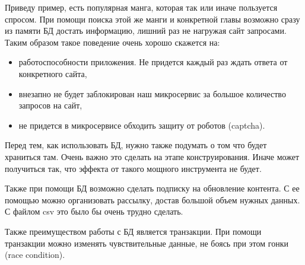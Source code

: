 Приведу пример, есть популярная манга, которая так или иначе пользуется спросом.
При помощи поиска этой же манги и конкретной главы возможно сразу из памяти БД достать информацию, лишний раз не нагружая сайт запросами.
Таким образом такое поведение очень хорошо скажется на:
\begin{itemize}
    \item работоспособности приложения. Не придется каждый раз ждать ответа от конкретного сайта,
    \item внезапно не будет заблокирован наш микросервис за большое количество запросов на сайт,
    \item не придется в микросервисе обходить защиту от роботов (captcha).
\end{itemize} 

Перед тем, как использовать БД, нужно также подумать о том что будет храниться там. Очень важно это сделать на этапе конструирования.
Иначе может получиться так, что эффекта от такого мощного инструмента не будет.

Также при помощи БД возможно сделать подписку на обновление контента. С ее помощью можно организовать рассылку, достав большой объем нужных данных.
С файлом csv это было бы очень трудно сделать.

Также преимуществом работы с БД является транзакции.
При помощи транзакции можно изменять чувствительные данные, не боясь при этом гонки (race condition).